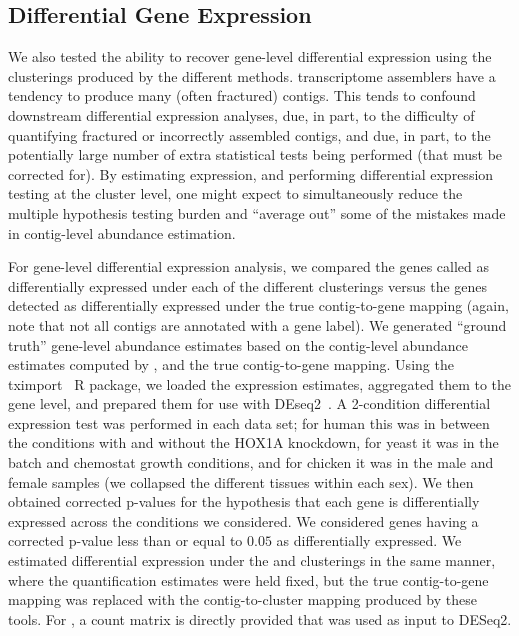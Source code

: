 \subsection{Differential Gene Expression}
\label{subsec:DGE}
We also tested the ability to recover gene-level differential expression using the clusterings produced by the different methods. \Denovo transcriptome assemblers have a tendency to produce many (often fractured) contigs. This tends to confound downstream differential expression analyses, due, in part, to the difficulty of quantifying fractured or incorrectly assembled contigs, and due, in part, to the potentially large number of extra statistical tests being performed (that must be corrected for). By estimating expression, and performing differential expression testing at the cluster level, one might expect to simultaneously reduce the multiple hypothesis testing burden and ``average out'' some of the mistakes made in contig-level abundance estimation.

For gene-level differential expression analysis, we compared the genes called as differentially expressed under each of the different clusterings versus the genes detected as differentially expressed under the true contig-to-gene mapping (again, note that not all contigs are annotated with a gene label). We generated ``ground truth'' gene-level abundance estimates based on the contig-level abundance estimates computed by \sailfish, and the true contig-to-gene mapping.  Using the tximport~\citep{tximport} R package, we loaded the \sailfish expression estimates, aggregated them to the gene level, and prepared them for use with DEseq2~\citep{deseq2}.  A 2-condition differential expression test was performed in each data set; for human this was in between the conditions with and without the HOX1A knockdown, for yeast it was in the batch and chemostat growth conditions, and for chicken it was in the male and female samples (we collapsed the different tissues within each sex). We then obtained corrected p-values for the hypothesis that each gene is differentially expressed across the conditions we considered. We considered genes having a corrected p-value less than or equal to $0.05$ as differentially expressed. We estimated differential expression under the \rapclust and \cdhit clusterings in the same manner, where the quantification estimates were held fixed, but the true contig-to-gene mapping was replaced with the contig-to-cluster mapping produced by these tools.  For \corset, a count matrix is directly provided that was used as input to DESeq2.


